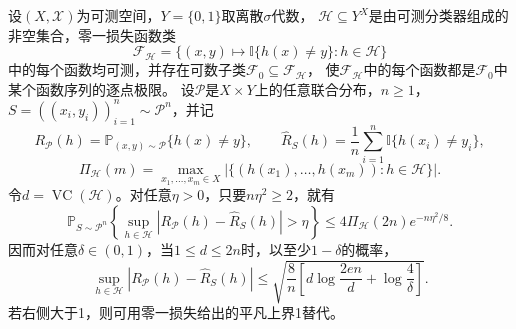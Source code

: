 \begin{theorem}[VC一致收敛界]
\label{thm:vc-uniform-convergence}
设$(X,\mathcal X)$为可测空间，$Y=\{0,1\}$取离散$\sigma$代数，
$\mathcal H\subseteq Y^X$是由可测分类器组成的非空集合，零一损失函数类
\[
 \mathcal F_{\mathcal H}
 =\{(x,y)\mapsto\mathbb I\{h(x)\neq y\}:h\in\mathcal H\}
\]
中的每个函数均可测，并存在可数子类$\mathcal F_0\subseteq\mathcal F_{\mathcal H}$，
使$\mathcal F_{\mathcal H}$中的每个函数都是$\mathcal F_0$中某个函数序列的逐点极限。
设$\mathcal P$是$X\times Y$上的任意联合分布，$n\geq1$，
$S=((x_i,y_i))_{i=1}^n\sim\mathcal P^n$，并记
\[
 R_{\mathcal P}(h)=\mathbb P_{(x,y)\sim\mathcal P}\{h(x)\neq y\},\qquad
 \hat R_S(h)=\frac1n\sum_{i=1}^n\mathbb I\{h(x_i)\neq y_i\},
\]
\[
 \Pi_{\mathcal H}(m)
 =\max_{x_1,\ldots,x_m\in X}
 \left|\{(h(x_1),\ldots,h(x_m)):h\in\mathcal H\}\right|.
\]
令$d=\operatorname{VC}(\mathcal H)$。对任意$\eta>0$，只要$n\eta^2\geq2$，就有
\begin{equation}
 \mathbb P_{S\sim\mathcal P^n}\left\{
   \sup_{h\in\mathcal H}|R_{\mathcal P}(h)-\hat R_S(h)|>\eta
 \right\}
 \leq4\Pi_{\mathcal H}(2n)e^{-n\eta^2/8}.
 \label{eq:vc-symmetrization-probability}
\end{equation}
因而对任意$\delta\in(0,1)$，当$1\leq d\leq2n$时，以至少$1-\delta$的概率，
\begin{equation}
 \sup_{h\in\mathcal H}|R_{\mathcal P}(h)-\hat R_S(h)|
 \leq
 \sqrt{\frac8n\left[
   d\log\frac{2en}{d}+\log\frac4\delta
 \right]}.
 \label{eq:vc-uniform-bound}
\end{equation}
若右侧大于1，则可用零一损失给出的平凡上界1替代。
\end{theorem}

